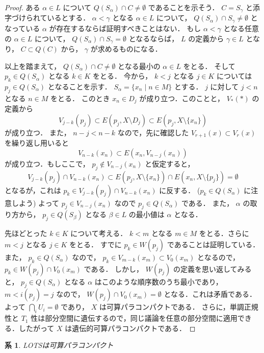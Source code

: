 \documentclass[leqno, 12pt]{ltjsarticle}
\newtheorem{cor}[thm]{系}
\begin{document}
\begin{proof}
ある
$\alpha\in L$
について
$Q(S_{\alpha})\cap C\neq\emptyset$
であることを示そう．
$C=S_{\gamma}$
と添字づけられているとする．
$\alpha<\gamma$
となる
$\alpha\in L$
について，
$Q(S_{\alpha})\cap S_{\gamma}\neq\emptyset$
となっている
$\alpha$
が存在するならば証明すべきことはない．
もし
$\alpha<\gamma$
となる任意の
$\alpha\in L$
について，
$Q(S_{\alpha})\cap S_{\gamma}=\emptyset$
となるならば，
$L$
の定義から
$\gamma\in L$
となり，
$C\subset Q(C)$
から，
$\gamma$
が求めるものになる．

以上を踏まえて，
$Q(S_{\alpha})\cap C\neq\emptyset$
となる最小の
$\alpha\in L$
をとる．
そして
$p_{k}\in Q(S_{\alpha})$
となる
$k\in K$
をとる．
今から，
$k<j$
となる
$j\in K$
については
$p_{j}\in Q(S_{\alpha})$
となることを示す．
$S_{\alpha}=\{x_{n} \mid n\in M\}$
とする．
$j$
に対して
$j<n$
となる
$n\in M$
をとる．
このとき
$x_{n}\in D_{j}$
が成り立つ．このことと，
$V_{*}(*)$
の定義から
\[
V_{j-k}(p_{j})\subset E(p_{j}, X\setminus D_{j})\subset E(p_{j}, X\setminus \{x_{n}\})
\]
が成り立つ．
また，
$n-j<n-k$
なので，先に確認した
$V_{r+1}(x)\subset V_{r}(x)$
を繰り返し用いると
\[
V_{n-k}(x_{n})\subset E(x_{n}, V_{n-j}(x_{n}))
\]
が成り立つ．もしここで，
$p_{j}\notin V_{n-j}(x_{n})$
と仮定すると，
\[
V_{j-k}(p_{j})\cap V_{n-k}(x_{n})\subset E(p_{j}, X\setminus \{x_{n}\})\cap E(x_{n}, X\setminus \{p_{j}\})=\emptyset
\]
となるが，これは
$p_{k}\in V_{j-k}(p_{j})\cap V_{n-k}(x_{n})$
に反する．
($p_{k}\in Q(S_{\alpha})$
に注意しよう)
よって
$p_{j} \in V_{n-j}(x_{n})$
なので
$p_{j}\in Q(S_{\alpha})$
である．
また，
$\alpha$
の取り方から，
$p_{j}\in Q(S_{\beta})$
となる
$\beta\in L$
の最小値は
$\alpha$
となる．

先ほどとった
$k\in K$
について考える．
$k<m$
となる
$m\in M$
をとる．さらに
$m<j$
となる
$j\in K$
をとる．
すでに
$p_{k}\in W(p_{j})$
であることは証明している．
また，
$p_{k}\in Q(S_{\alpha})$
なので，
$p_{k}\in V_{m-k}(x_{m})\subset V_{0}(x_{m})$
となるので，
$p_{k}\in W(p_{j})\cap V_{0}(x_{m})$
である．
しかし，
$W(p_{j})$
の定義を思い返してみると，
$p_{j}\in Q(S_{\alpha})$
となる
$\alpha$
はこのような順序数のうち最小であり，
$m<i(p_{j})=j$
なので，
$W(p_{j})\cap V_{0}(x_{m})=\emptyset$
となる．これは矛盾である．よって
$\bigcap_{i}U_{i}=\emptyset$
であり，
$X$
は可算パラコンパクトである．
さらに，単調正規性と
$T_{1}$
性は部分空間に遺伝するので，同じ議論を任意の部分空間に適用できる．したがって
$X$
は遺伝的可算パラコンパクトである．

\end{proof}


\begin{cor}
LOTSは可算パラコンパクト
\end{cor}
\end{document}
